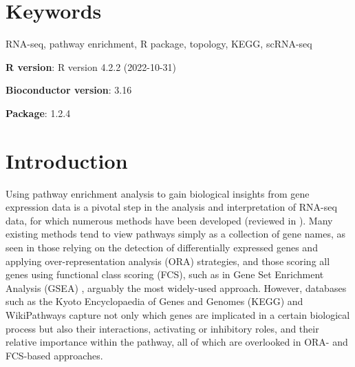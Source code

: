 \documentclass[9pt,a4paper,]{extarticle}
\begin{document}
\section*{Keywords}
RNA-seq, pathway enrichment, R package, topology, KEGG, scRNA-seq


\clearpage
\pagestyle{main}

\textbf{R version}: R version 4.2.2 (2022-10-31)

\textbf{Bioconductor version}: 3.16

\textbf{Package}: 1.2.4

\hypertarget{introduction}{%
\section{Introduction}\label{introduction}}

Using pathway enrichment analysis to gain biological insights from gene expression data is a pivotal step in the analysis and interpretation of RNA-seq data, for which numerous methods have been developed (reviewed in \citep{Maleki2020-ur, Mubeen2022-eq}).
Many existing methods tend to view pathways simply as a collection of gene names, as seen in those relying on the detection of differentially expressed genes and applying over-representation analysis (ORA) strategies, and those scoring all genes using functional class scoring (FCS), such as in Gene Set Enrichment Analysis (GSEA) \citep{Subramanian2005-lx}, arguably the most widely-used approach.
However, databases such as the Kyoto Encyclopaedia of Genes and Genomes (KEGG)\citep{OgataKEGGKyotoEncyclopediaa} and WikiPathways\citep{Martens2021} capture not only which genes are implicated in a certain biological process but also their interactions, activating or inhibitory roles, and their relative importance within the pathway, all of which are overlooked in ORA- and FCS-based approaches.
\end{document}
